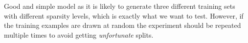 Good and simple model as it is likely to generate three different training sets
with different sparsity levels, which is exactly what we want to test. However,
if the training examples are drawn at random the experiment should be repeated multiple
times to avoid getting \emph{unfortunate} splits.








